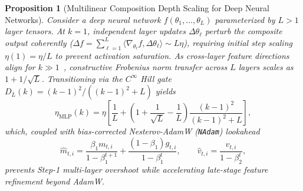 \documentclass[10pt,twocolumn,letterpaper]{article}
\newtheorem{proposition}[theorem]{Proposition}
\theoremstyle{definition}
\theoremstyle{remark}
\begin{document}
\begin{proposition}[Multilinear Composition Depth Scaling for Deep Neural Networks]
\label{prop:mlp_depth}
Consider a deep neural network $f(\theta_1, \dots, \theta_L)$ parameterized by $L > 1$ layer tensors. At $k=1$, independent layer updates $\Delta\theta_\ell$ perturb the composite output coherently ($\Delta f = \sum_{\ell=1}^L \langle \nabla_{\theta_\ell} f, \Delta\theta_\ell \rangle \sim L\eta$), requiring initial step scaling $\eta(1) = \eta / L$ to prevent activation saturation. As cross-layer feature directions align for $k \gg 1$~\cite{yang2022tensor}, constructive Frobenius norm transfer across $L$ layers scales as $1 + 1/\sqrt{L}$. Transitioning via the $C^\infty$ Hill gate $D_L(k) = (k-1)^2 / ((k-1)^2 + L)$ yields
\begin{equation}
  \eta_{\mathrm{MLP}}(k) = \eta \left[\frac{1}{L} + \left(1 + \frac{1}{\sqrt{L}} - \frac{1}{L}\right)\frac{(k-1)^2}{(k-1)^2 + L}\right],
  \label{eq:mlp_lr}
\end{equation}
which, coupled with bias-corrected Nesterov-AdamW (\texttt{NAdam}) lookahead~\cite{dozat2016incorporating}
\begin{equation}
  \hat{m}_{t,i} = \frac{\beta_1 m_{t,i}}{1 - \beta_1^{t+1}} + \frac{(1-\beta_1)g_{t,i}}{1 - \beta_1^t}, \qquad \hat{v}_{t,i} = \frac{v_{t,i}}{1 - \beta_2^t},
  \label{eq:nadam_lookahead}
\end{equation}
prevents Step-1 multi-layer overshoot while accelerating late-stage feature refinement beyond AdamW.
\end{proposition}
\end{document}
